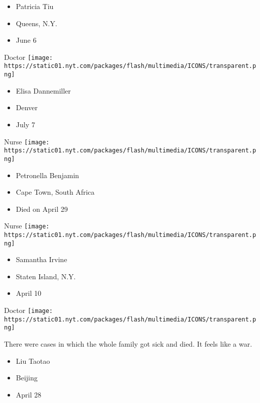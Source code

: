 \begin{itemize}
\tightlist
\item
  Patricia Tiu
\item
  Queens, N.Y.
\item
  June 6
\end{itemize}

\protect\hyperlink{item-elisa-dannemiller}{}

Doctor
\texttt{[image: https://static01.nyt.com/packages/flash/multimedia/ICONS/transparent.png]}

\begin{itemize}
\tightlist
\item
  Elisa Dannemiller
\item
  Denver
\item
  July 7
\end{itemize}

\protect\hyperlink{item-petronella-benjamin}{}

Nurse
\texttt{[image: https://static01.nyt.com/packages/flash/multimedia/ICONS/transparent.png]}

\begin{itemize}
\tightlist
\item
  Petronella Benjamin
\item
  Cape Town, South Africa
\item
  Died on April 29
\end{itemize}

\protect\hyperlink{item-samantha-irvine}{}

Nurse
\texttt{[image: https://static01.nyt.com/packages/flash/multimedia/ICONS/transparent.png]}

\begin{itemize}
\tightlist
\item
  Samantha Irvine
\item
  Staten Island, N.Y.
\item
  April 10
\end{itemize}

\protect\hyperlink{item-liu-taotao}{}

Doctor
\texttt{[image: https://static01.nyt.com/packages/flash/multimedia/ICONS/transparent.png]}

There were cases in which the whole family got sick and died. It feels
like a war.

\begin{itemize}
\tightlist
\item
  Liu Taotao
\item
  Beijing
\item
  April 28
\end{itemize}


